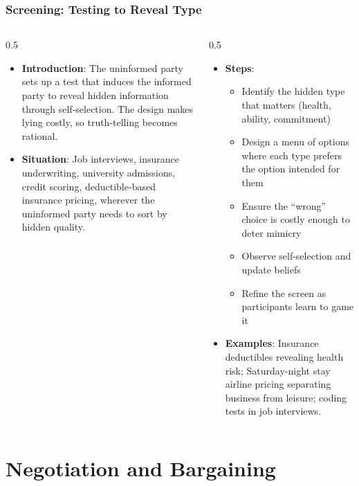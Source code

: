 \begin{frame}[fragile]\frametitle{Screening: Testing to Reveal Type}
\begin{columns}
    \begin{column}[T]{0.5\linewidth}
      \begin{itemize}
        \item \textbf{Introduction}: The uninformed party sets up a test that induces the informed party to reveal hidden information through self-selection. The design makes lying costly, so truth-telling becomes rational.
        \item \textbf{Situation}: Job interviews, insurance underwriting, university admissions, credit scoring, deductible-based insurance pricing, wherever the uninformed party needs to sort by hidden quality.
      \end{itemize}
    \end{column}
    \begin{column}[T]{0.5\linewidth}
      \begin{itemize}
        \item \textbf{Steps}:
        \begin{itemize}
          \item Identify the hidden type that matters (health, ability, commitment)
          \item Design a menu of options where each type prefers the option intended for them
          \item Ensure the ``wrong'' choice is costly enough to deter mimicry
          \item Observe self-selection and update beliefs
          \item Refine the screen as participants learn to game it
        \end{itemize}\item \textbf{Examples}: Insurance deductibles revealing health risk; Saturday-night stay airline pricing separating business from leisure; coding tests in job interviews.
      \end{itemize}
    \end{column}
  \end{columns}
\end{frame}

\section{Negotiation and Bargaining}

